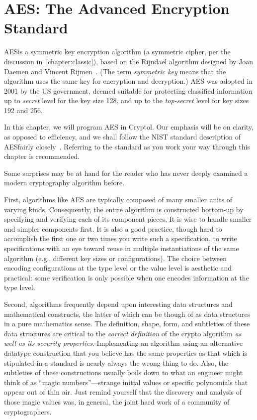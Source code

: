 
\chapter{AES: The Advanced Encryption Standard}
\label{chapter:aes}

AES\indAES is a symmetric key encryption algorithm (a symmetric
cipher, per the discussion in~\autoref{chapter:classic}), based on the
Rijndael algorithm designed by Joan Daemen and Vincent
Rijmen~\cite{DaemenR02}\glosAES. (The term {\em symmetric key} means
that the algorithm uses the same key for encryption and
decryption.\indSymKey) AES was adopted in 2001 by the US government,
deemed suitable for protecting classified information up to {\em
  secret} level for the key size 128, and up to the {\em top-secret}
level for key sizes 192 and 256.

In this chapter, we will program AES in Cryptol. Our emphasis will be
on clarity, as opposed to efficiency, and we shall follow the NIST
standard description of AES\indAES fairly closely~\cite{aes}\glosNIST.
Referring to the standard as you work your way through this chapter is
recommended.

Some surprises may be at hand for the reader who has never deeply
examined a modern cryptography algorithm before.

First, algorithms like AES are typically composed of many smaller
units of varying kinds.  Consequently, the entire algorithm is
constructed bottom-up by specifying and verifying each of its
component pieces.  It is wise to handle smaller and simpler components
first.  It is also a good practice, though hard to accomplish the
first one or two times you write such a specification, to write
specifications with an eye toward reuse in multiple instantiations of
the same algorithm (e.g., different key sizes or configurations).  The
choice between encoding configurations at the type level or the value
level is aesthetic and practical: some verification is only possible
when one encodes information at the type level.

Second, algorithms frequently depend upon interesting data structures
and mathematical constructs, the latter of which can be though of as
data structures in a pure mathematics sense.  The definition, shape,
form, and subtleties of these data structures are critical to the
\emph{correct definition} of the crypto algorithm \emph{as well as its
  security properties}.  Implementing an algorithm using an
alternative datatype construction that you believe has the same
properties as that which is stipulated in a standard is nearly always
the wrong thing to do.  Also, the subtleties of these constructions
usually boils down to what an engineer might think of as ``magic
numbers''---strange initial values or specific polynomials that appear
out of thin air.  Just remind yourself that the discovery and analysis
of those magic values was, in general, the joint hard work of a
community of cryptographers.

